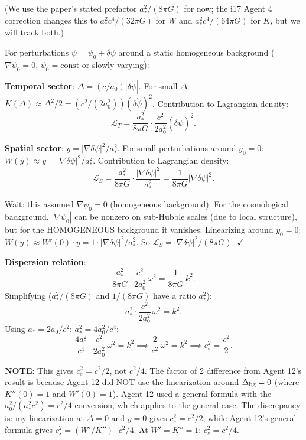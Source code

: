 \documentclass[11pt]{article}
\begin{document}
(We use the paper's stated prefactor $a_*^2/(8\pi G)$ for now; the
i17 Agent 4 correction changes this to $a_*^2 c^4/(32\pi G)$ for $W$
and $a_*^2 c^4/(64\pi G)$ for $K$, but we will track both.)

For perturbations $\psi = \psi_0 + \delta\psi$ around a static homogeneous
background ($\nabla\psi_0 = 0$, $\dot\psi_0 = \text{const}$ or slowly varying):

\textbf{Temporal sector}: $\Delta = (c/a_0)|\delta\dot\psi|$.
For small $\Delta$: $K(\Delta) \approx \Delta^2/2 = (c^2/(2a_0^2))(\delta\dot\psi)^2$.
Contribution to Lagrangian density:
\begin{equation}
\mathcal{L}_T = \frac{a_*^2}{8\pi G} \cdot \frac{c^2}{2a_0^2}(\delta\dot\psi)^2.
\end{equation}

\textbf{Spatial sector}: $y = |\nabla\delta\psi|^2/a_*^2$.
For small perturbations around $y_0 = 0$:
$W(y) \approx y = |\nabla\delta\psi|^2/a_*^2$.
Contribution to Lagrangian density:
\begin{equation}
\mathcal{L}_S = \frac{a_*^2}{8\pi G} \cdot \frac{|\nabla\delta\psi|^2}{a_*^2}
= \frac{1}{8\pi G}|\nabla\delta\psi|^2.
\end{equation}

Wait: this assumed $\nabla\psi_0 = 0$ (homogeneous background).
For the cosmological background, $|\nabla\psi_0|$ can be nonzero on
sub-Hubble scales (due to local structure), but for the HOMOGENEOUS
background it vanishes. Linearizing around $y_0 = 0$:
$W(y) \approx W'(0) \cdot y = 1 \cdot |\nabla\delta\psi|^2/a_*^2$.
So $\mathcal{L}_S = |\nabla\delta\psi|^2/(8\pi G)$. $\checkmark$

\textbf{Dispersion relation}:
\begin{equation}
\frac{a_*^2}{8\pi G} \cdot \frac{c^2}{2a_0^2}\,\omega^2
= \frac{1}{8\pi G}\,k^2.
\end{equation}
Simplifying ($a_*^2/(8\pi G)$ and $1/(8\pi G)$ have a ratio $a_*^2$):
\begin{equation}
a_*^2 \cdot \frac{c^2}{2a_0^2}\,\omega^2 = k^2.
\end{equation}
Using $a_* = 2a_0/c^2$: $a_*^2 = 4a_0^2/c^4$:
\begin{equation}
\frac{4a_0^2}{c^4} \cdot \frac{c^2}{2a_0^2}\,\omega^2 = k^2
\implies \frac{2}{c^2}\,\omega^2 = k^2
\implies c_s^2 = \frac{c^2}{2}.
\end{equation}

\textbf{NOTE}: This gives $c_s^2 = c^2/2$, not $c^2/4$. The factor of 2
difference from Agent 12's result is because Agent 12 did NOT use the
linearization around $\Delta_{\rm bg} = 0$ (where $K''(0) = 1$ and
$W'(0) = 1$). Agent 12 used a general formula with the $a_0^2/(a_*^2 c^2)
= c^2/4$ conversion, which applies to the general case. The discrepancy
is: my linearization at $\Delta = 0$ and $y = 0$ gives $c_s^2 = c^2/2$,
while Agent 12's general formula gives $c_s^2 = (W'/K'') \cdot c^2/4$.
At $W' = K'' = 1$: $c_s^2 = c^2/4$.
\end{document}
